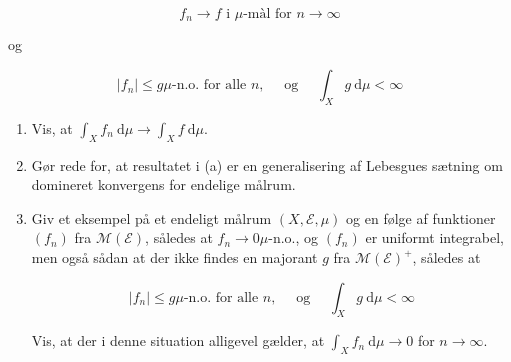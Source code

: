 \documentclass{Class}
\begin{document}
$$
f_n \rightarrow f \text { i } \mu \text {-màl for } n \rightarrow \infty
$$

og

$$
\left|f_n\right| \leq g \mu \text {-n.o. for alle } n, \quad \text { og } \quad \int_X g \mathrm{~d} \mu<\infty
$$
\begin{enumerate}
    \item Vis, at $\int_X f_n \mathrm{~d} \mu \rightarrow \int_X f \mathrm{~d} \mu$.
    \item Gør rede for, at resultatet i (a) er en generalisering af Lebesgues sætning om domineret konvergens for endelige målrum.
    \item Giv et eksempel på et endeligt målrum $(X, \mathcal{E}, \mu)$ og en følge af funktioner $\left(f_n\right)$ fra $\mathcal{M}(\mathcal{E})$, således at $f_n \rightarrow 0 \mu$-n.o., og $\left(f_n\right)$ er uniformt integrabel, men også sådan at der ikke findes en majorant $g$ fra $\mathcal{M}(\mathcal{E})^{+}$, således at

    $$
    \left|f_n\right| \leq g \mu \text {-n.o. for alle } n, \quad \text { og } \quad \int_X g \mathrm{~d} \mu<\infty
    $$
    
    
    Vis, at der i denne situation alligevel gælder, at $\int_X f_n \mathrm{~d} \mu \rightarrow 0$ for $n \rightarrow \infty$.
\end{enumerate}
\solution
\end{document}
